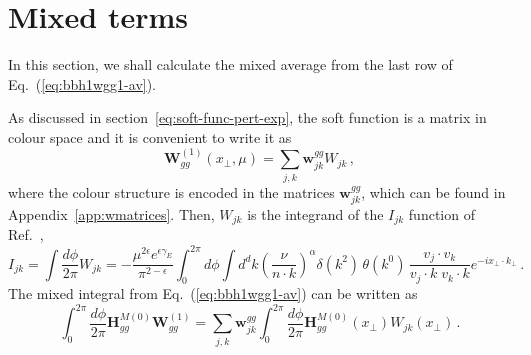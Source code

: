 \documentclass[a4paper,11pt]{report}
\numberwithin{equation}{section}
\begin{document}
\section{Mixed terms}

In this section, we shall calculate the mixed average from the last row of
Eq.~(\ref{eq:bbh1wgg1-av}).
 
As discussed in section~\ref{eq:soft-func-pert-exp}, the soft function is a matrix in colour space and it is convenient to write it as
\begin{equation}
  \bm{W}^{(1)}_{gg} (x_\perp,\mu) = 
  \sum_{j,k} \bm{w}^{gg}_{jk} W_{jk}\,,
\end{equation}
%
where the colour structure is encoded in the matrices $\bm{w}^{gg}_{jk}$, which
can be found in Appendix~\ref{app:wmatrices}.
%
Then, $W_{jk}$ is the integrand of
the $I_{jk}$ function of Ref.~\cite{Li:2013mia}, \ie
%
\begin{equation}
  I_{jk} =  \int \frac{d\phi}{2\pi} W_{jk} =
  -\frac{\mu^{2\epsilon} e^{\epsilon \gamma_E}}{\pi^{2-\epsilon}}
  \int_0^{2\pi} d\phi
  \int d^d k
  \left(\frac{\nu}{n\cdot k}\right)^\alpha
  \delta(k^2)\, \theta(k^0)\,
  \frac{v_j \cdot v_k}{v_j \cdot k\; v_k \cdot k}
  e^{-i x_\perp \cdot k_\perp}\,.
  \label{eq:Ijk-av}
\end{equation}
%
The mixed integral from Eq.~(\ref{eq:bbh1wgg1-av}) can be written as
%
\begin{equation}
  \int_0^{2\pi} \frac{d\phi}{2\pi}
  \bm{H}^{M(0)}_{gg}\bm{W}^{(1)}_{gg}
  =
  \sum_{j,k} \bm{w}^{gg}_{jk}
  \int_0^{2\pi} \frac{d\phi}{2\pi}
  \bm{H}^{M(0)}_{gg} (x_\perp) W_{jk} (x_\perp)\,.
  \label{eq:mixed-integral}
\end{equation}
%
%
%
\end{document}
